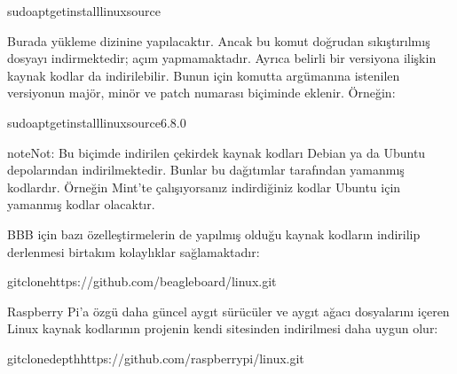\documentclass[a4paper,10pt,turkish]{sphinxmanual}
\begin{document}
\begin{sphinxVerbatim}[commandchars=\\\{\}]
\PYGZdl{}sudoapt\PYGZhy{}getinstalllinux\PYGZhy{}source
\end{sphinxVerbatim}

\sphinxAtStartPar
Burada yükleme  dizinine yapılacaktır. Ancak bu komut doğrudan sıkıştırılmış dosyayı
indirmektedir; açım yapmamaktadır. Ayrıca belirli bir versiyona ilişkin kaynak kodlar da indirilebilir.
Bunun için komutta  argümanına istenilen versiyonun majör, minör ve patch numarası
 biçiminde eklenir. Örneğin:

\begin{sphinxVerbatim}[commandchars=\\\{\}]
\PYGZdl{}sudoapt\PYGZhy{}getinstalllinux\PYGZhy{}source\PYGZhy{}6.8.0
\end{sphinxVerbatim}

\begin{sphinxadmonition}{note}{Not:}
\sphinxAtStartPar
Bu biçimde indirilen çekirdek kaynak kodları Debian ya da Ubuntu depolarından indirilmektedir.
Bunlar bu dağıtımlar tarafından yamanmış kodlardır. Örneğin Mint’te çalışıyorsanız indirdiğiniz
kodlar Ubuntu için yamanmış kodlar olacaktır.
\end{sphinxadmonition}

\sphinxAtStartPar
{}

\sphinxAtStartPar
BBB için bazı özelleştirmelerin de yapılmış olduğu kaynak kodların indirilip derlenmesi birtakım
kolaylıklar sağlamaktadır:

\begin{sphinxVerbatim}[commandchars=\\\{\}]
\PYGZdl{}gitclonehttps://github.com/beagleboard/linux.git
\end{sphinxVerbatim}

\sphinxAtStartPar
{}

\sphinxAtStartPar
Raspberry Pi’a özgü daha güncel aygıt sürücüler ve aygıt ağacı dosyalarını içeren Linux kaynak
kodlarının projenin kendi sitesinden indirilmesi daha uygun olur:

\begin{sphinxVerbatim}[commandchars=\\\{\}]
\PYGZdl{}gitclone\PYGZhy{}\PYGZhy{}depthhttps://github.com/raspberrypi/linux.git
\end{sphinxVerbatim}
\end{document}
